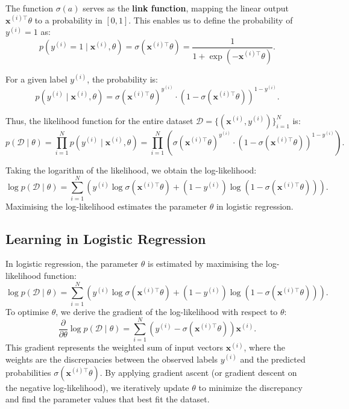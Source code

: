 


The function \( \sigma(a) \) serves as the \textbf{link function}, mapping the linear output \( \boldsymbol{x}^{(i)\top}\theta \) to a probability in \([0,1]\). This enables us to define the probability of \( y^{(i)} = 1 \) as:
\[
    p(y^{(i)} = 1 \mid \boldsymbol{x}^{(i)}, \theta) = \sigma(\boldsymbol{x}^{(i)\top}\theta) = \frac{1}{1 + \exp(-\boldsymbol{x}^{(i)\top}\theta)}.
\]

For a given label \( y^{(i)} \), the probability is:
\[
    p(y^{(i)} \mid \boldsymbol{x}^{(i)}, \theta) = \sigma(\boldsymbol{x}^{(i)\top}\theta)^{y^{(i)}} \cdot (1 - \sigma(\boldsymbol{x}^{(i)\top}\theta))^{1 - y^{(i)}}.
\]

Thus, the likelihood function for the entire dataset \( \mathcal{D} = \{(\boldsymbol{x}^{(i)}, y^{(i)})\}_{i=1}^{N} \) is:
\[
    p(\mathcal{D} \mid \theta) = \prod_{i=1}^{N} p(y^{(i)} \mid \boldsymbol{x}^{(i)}, \theta) = \prod_{i=1}^{N} \left( \sigma(\boldsymbol{x}^{(i)\top}\theta)^{y^{(i)}} \cdot (1 - \sigma(\boldsymbol{x}^{(i)\top}\theta))^{1 - y^{(i)}} \right).
\]

Taking the logarithm of the likelihood, we obtain the log-likelihood:
\[
    \log p(\mathcal{D} \mid \theta) = \sum_{i=1}^{N} \left( y^{(i)} \log \sigma(\boldsymbol{x}^{(i)\top}\theta) + (1 - y^{(i)}) \log (1 - \sigma(\boldsymbol{x}^{(i)\top}\theta)) \right).
\]
Maximising the log-likelihood estimates the parameter \( \theta \) in logistic regression.

\subsection{Learning in Logistic Regression}

In logistic regression, the parameter \( \theta \) is estimated by maximising the log-likelihood function:
\[
    \log p(\mathcal{D} \mid \theta) = \sum_{i=1}^{N} \left( y^{(i)} \log \sigma(\boldsymbol{x}^{(i)\top}\theta) + (1 - y^{(i)}) \log (1 - \sigma(\boldsymbol{x}^{(i)\top}\theta)) \right).
\]
To optimise \( \theta \), we derive the gradient of the log-likelihood with respect to \( \theta \):
\[
    \frac{\partial}{\partial \theta} \log p(\mathcal{D} \mid \theta) = \sum_{i=1}^{N} \left( y^{(i)} - \sigma(\boldsymbol{x}^{(i)\top}\theta) \right) \boldsymbol{x}^{(i)}.
\]
This gradient represents the weighted sum of input vectors \( \boldsymbol{x}^{(i)} \), where the weights are the discrepancies between the observed labels \( y^{(i)} \) and the predicted probabilities \( \sigma(\boldsymbol{x}^{(i)\top}\theta) \). By applying gradient ascent (or gradient descent on the negative log-likelihood), we iteratively update \( \theta \) to minimize the discrepancy and find the parameter values that best fit the dataset.

